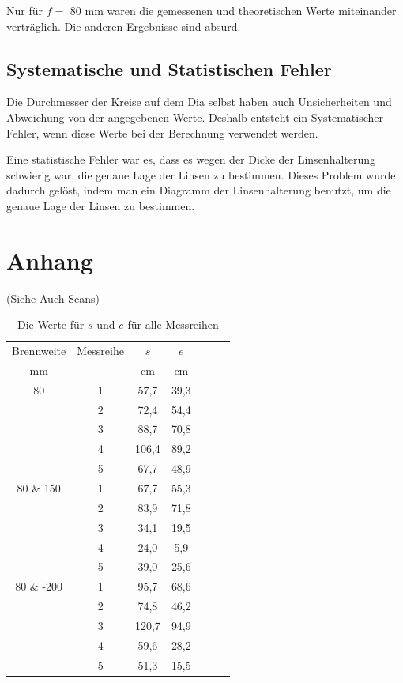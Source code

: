 \documentclass[11pt,a4paper]{article}
\begin{document}
Nur für $f=$ 80 mm waren die gemessenen und theoretischen Werte miteinander verträglich. Die anderen Ergebnisse sind absurd. 

\subsection{Systematische und Statistischen Fehler}
Die Durchmesser der Kreise auf dem Dia selbst haben auch Unsicherheiten und Abweichung von der angegebenen Werte. Deshalb entsteht ein Systematischer Fehler, wenn diese Werte bei der Berechnung verwendet werden. 

Eine statistische Fehler war es, dass es wegen der Dicke der Linsenhalterung schwierig war, die genaue Lage der Linsen zu bestimmen. Dieses Problem wurde dadurch gelöst, indem man ein Diagramm der Linsenhalterung benutzt, um die genaue Lage der Linsen zu bestimmen. 

\section{Anhang}
(Siehe Auch Scans)

\begin{table}[h]
	\centering
	\begin{tabular*}{0.50\textwidth}{@{\extracolsep{\fill}}cc|ccccc}
		\toprule
		Brennweite & Messreihe & $s$ & $e$   \\
		mm &  & cm & cm  \\
		\bottomrule
		80 & 1 & 57,7 & 39,3 \\
		& 2 & 72,4 & 54,4 \\
		& 3 & 88,7 & 70,8 \\
		& 4 & 106,4 & 89,2 \\
		& 5 & 67,7 & 48,9 \\
		80 \& 150 & 1 & 67,7 & 55,3 \\
		& 2 & 83,9 & 71,8 \\
		& 3 & 34,1 & 19,5 \\
		& 4 & 24,0 & 5,9 \\
		& 5 & 39,0 & 25,6 \\
		80 \& -200 & 1 & 95,7 & 68,6 \\
		& 2 & 74,8 & 46,2 \\
		& 3 & 120,7 & 94,9 \\
		& 4 & 59,6 & 28,2 \\
		& 5 & 51,3 & 15,5 \\
		\bottomrule
	\end{tabular*}
	\caption{Die Werte für $s$ und $e$ für alle Messreihen}
\end{table}
\end{document}
